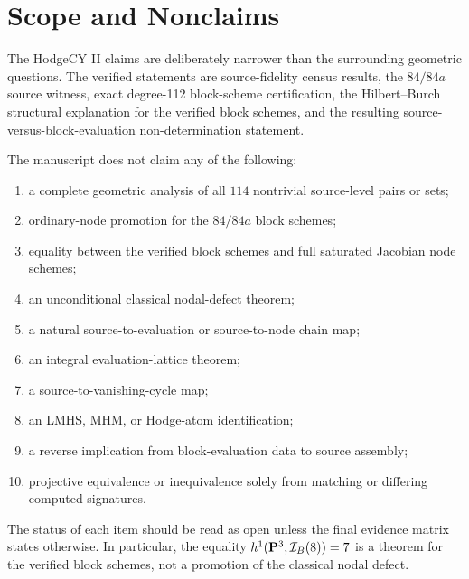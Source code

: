 \section{Scope and Nonclaims}\label{sec:scope-nonclaims}

The HodgeCY II claims are deliberately narrower than the surrounding
geometric questions.  The verified statements are source-fidelity census
results, the \(84/84a\) source witness, exact degree-112 block-scheme
certification, the Hilbert--Burch structural explanation for the verified
block schemes, and the resulting source-versus-block-evaluation
non-determination statement.

The manuscript does not claim any of the following:

\begin{enumerate}
\item a complete geometric analysis of all \(114\) nontrivial source-level
  pairs or sets;
\item ordinary-node promotion for the \(84/84a\) block schemes;
\item equality between the verified block schemes and full saturated Jacobian
  node schemes;
\item an unconditional classical nodal-defect theorem;
\item a natural source-to-evaluation or source-to-node chain map;
\item an integral evaluation-lattice theorem;
\item a source-to-vanishing-cycle map;
\item an LMHS, MHM, or Hodge-atom identification;
\item a reverse implication from block-evaluation data to source assembly;
\item projective equivalence or inequivalence solely from matching or differing
  computed signatures.
\end{enumerate}

The status of each item should be read as open unless the final evidence matrix
states otherwise.  In particular, the equality \(h^1({\bf P}^3,\mathcal
I_B(8))=7\) is a theorem for the verified block schemes, not a promotion of
the classical nodal defect.
